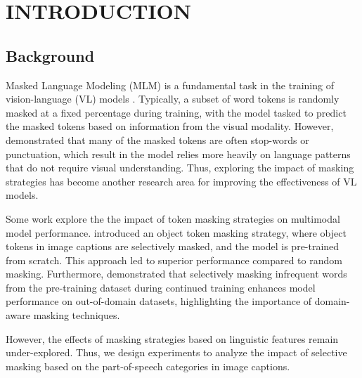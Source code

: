 \setlength{\parindent}{0in}
\setlength{\parskip}{1.5mm}
\setlength{\baselineskip}{1.6em}

\chapter{INTRODUCTION}
\section{Background}
Masked Language Modeling (MLM) is a fundamental task in the training of vision-language (VL) models \cite{albef, mplug, uniter, beit-3}. 
Typically, a subset of word tokens is randomly masked at a fixed percentage during training, with the model tasked to predict the masked tokens based on information from the visual modality. 
However,  demonstrated that many of the masked tokens are often stop-words or punctuation, which result in the model relies more heavily on language patterns that do not require visual understanding.
Thus, exploring the impact of masking strategies has become another research area for improving the effectiveness of VL models.

Some work explore the the impact of token masking strategies on multimodal model performance. 
 introduced an object token masking strategy, where object tokens in image captions are selectively masked, and the model is pre-trained from scratch.
This approach led to superior performance compared to random masking. 
Furthermore,  demonstrated that selectively masking infrequent words from the pre-training dataset during continued training enhances model performance on out-of-domain datasets, highlighting the importance of domain-aware masking techniques.

However, the effects of masking strategies based on linguistic features remain under-explored. 
Thus, we design experiments to analyze the impact of selective masking based on the part-of-speech categories in image captions.

